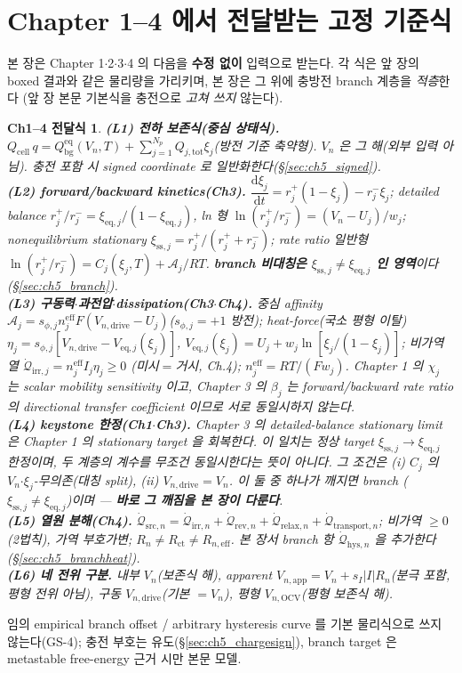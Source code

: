 \documentclass[11pt,a4paper]{article}
\newtheorem*{linkbox}{Ch1--4 전달식}
\newcommand{\dd}{\mathrm{d}}
\newcommand{\eff}{\mathrm{eff}}
\newcommand{\eq}{\mathrm{eq}}
\newcommand{\app}{\mathrm{app}}
\newcommand{\drive}{\mathrm{drive}}
\newcommand{\bg}{\mathrm{bg}}
\newcommand{\cell}{\mathrm{cell}}
\newcommand{\OCV}{\mathrm{OCV}}
\newcommand{\tot}{\mathrm{tot}}
\newcommand{\irr}{\mathrm{irr}}
\newcommand{\rev}{\mathrm{rev}}
\newcommand{\src}{\mathrm{src}}
\newcommand{\rlx}{\mathrm{relax}}
\newcommand{\ct}{\mathrm{ct}}
\newcommand{\transp}{\mathrm{transport}}
\newcommand{\hys}{\mathrm{hys}}
\newcommand{\sstat}{\mathrm{ss}}
\begin{document}
\section{Chapter 1--4 에서 전달받는 고정 기준식}\label{sec:ch5_inherit}
본 장은 Chapter 1$\cdot$2$\cdot$3$\cdot$4 의 다음을 \textbf{수정 없이} 입력으로 받는다. 각 식은 앞 장의
boxed 결과와 같은 물리량을 가리키며, 본 장은 그 위에 충방전 branch 계층을 \emph{적층}한다
(앞 장 본문 기본식을 충전으로 \emph{고쳐 쓰지} 않는다).
\begin{linkbox}
\textbf{(L1) 전하 보존식(중심 상태식).} $Q_\cell\,q=Q_\bg^{\eq}(V_n,T)+\sum_{j=1}^{N_p}Q_{j,\tot}\xi_j$(방전 기준
축약형). $V_n$ 은 그 해(외부 입력 아님). 충전 포함 시 signed coordinate 로 일반화한다(\S\ref{sec:ch5_signed}).\\
\textbf{(L2) forward/backward kinetics(Ch3).} $\dfrac{\dd\xi_j}{\dd t}=r_j^+(1-\xi_j)-r_j^-\xi_j$; detailed
balance $r_j^+/r_j^-=\xi_{\eq,j}/(1-\xi_{\eq,j})$, ln 형 $\ln(r_j^+/r_j^-)=(V_n-U_j)/w_j$; nonequilibrium
stationary $\xi_{\sstat,j}=r_j^+/(r_j^++r_j^-)$; rate ratio 일반형 $\ln(r_j^+/r_j^-)=C_j(\xi_j,T)+\mathcal A_j/RT$.
\textbf{branch 비대칭은 $\xi_{\sstat,j}\ne\xi_{\eq,j}$ 인 영역}이다(\S\ref{sec:ch5_branch}).\\
\textbf{(L3) 구동력$\cdot$과전압$\cdot$dissipation(Ch3$\cdot$Ch4).} 중심 affinity $\mathcal A_j=s_{\phi,j}n_j^{\eff}
F(V_{n,\drive}-U_j)$($s_{\phi,j}=+1$ 방전); heat-force(국소 평형 이탈) $\eta_j=s_{\phi,j}[V_{n,\drive}-V_{\eq,j}(\xi_j)]$,
$V_{\eq,j}(\xi_j)=U_j+w_j\ln[\xi_j/(1-\xi_j)]$; 비가역 열 $\dot{\mathcal Q}_{\irr,j}=n_j^{\eff}I_j\eta_j\ge0$
(미시$=$거시, Ch.4); $n_j^{\eff}=RT/(Fw_j)$. Chapter 1 의 $\chi_j$ 는 scalar mobility sensitivity 이고,
Chapter 3 의 $\beta_j$ 는 forward/backward rate ratio 의 directional transfer coefficient 이므로 서로
동일시하지 않는다.\\
\textbf{(L4) keystone 한정(Ch1$\cdot$Ch3).} Chapter 3 의 detailed-balance stationary limit 은 Chapter 1 의
stationary target 을 회복한다. 이 일치는
\emph{정상 target} $\xi_{\sstat,j}\to\xi_{\eq,j}$ \emph{한정}이며, 두 계층의 계수를 무조건 동일시한다는 뜻이 아니다. 그 조건은 (i) $C_j$
의 $V_n$$\cdot$$\xi_j$-무의존(대칭 split), (ii) $V_{n,\drive}=V_n$. \emph{이 둘 중 하나가 깨지면 branch}
($\xi_{\sstat,j}\ne\xi_{\eq,j}$)이며 — \textbf{바로 그 깨짐을 본 장이 다룬다}.\\
\textbf{(L5) 열원 분해(Ch4).} $\dot{\mathcal Q}_{\src,n}=\dot{\mathcal Q}_{\irr,n}+\dot{\mathcal Q}_{\rev,n}
+\dot{\mathcal Q}_{\rlx,n}+\dot{\mathcal Q}_{\transp,n}$; 비가역 $\ge0$(2법칙), 가역 부호가변; $R_n\ne R_\ct\ne R_{n,\eff}$.
본 장서 branch 항 $\dot{\mathcal Q}_{\hys,n}$ 을 추가한다(\S\ref{sec:ch5_branchheat}).\\
\textbf{(L6) 네 전위 구분.} 내부 $V_n$(보존식 해), apparent $V_{n,\app}=V_n+s_I|I|R_n$(분극 포함, 평형 전위
아님), 구동 $V_{n,\drive}$(기본 $=V_n$), 평형 $V_{n,\OCV}$(평형 보존식 해).
\end{linkbox}
임의 empirical branch offset / arbitrary hysteresis curve 를 기본 물리식으로 쓰지 않는다(GS-4); 충전 부호는
유도(\S\ref{sec:ch5_chargesign}), branch target 은 metastable free-energy 근거 시만 본문 모델.
\end{document}
